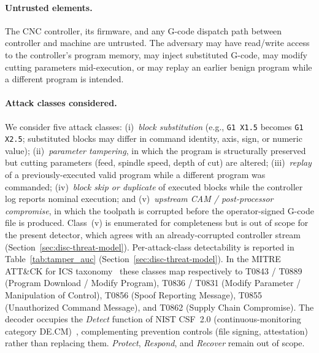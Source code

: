 \documentclass[sensors,article,submit,moreauthors,pdftex]{Definitions/mdpi}
\begin{document}
\paragraph{Untrusted elements.} The CNC controller, its firmware, and any G-code dispatch path between controller and machine are untrusted. The adversary may have read/write access to the controller's program memory, may inject substituted G-code, may modify cutting parameters mid-execution, or may replay an earlier benign program while a different program is intended.

\paragraph{Attack classes considered.} We consider five attack classes: (i)~\emph{block substitution} (e.g., \texttt{G1 X1.5} becomes \texttt{G1 X2.5}; substituted blocks may differ in command identity, axis, sign, or numeric value); (ii)~\emph{parameter tampering}, in which the program is structurally preserved but cutting parameters (feed, spindle speed, depth of cut) are altered; (iii)~\emph{replay} of a previously-executed valid program while a different program was commanded; (iv)~\emph{block skip or duplicate} of executed blocks while the controller log reports nominal execution; and (v)~\emph{upstream CAM / post-processor compromise}, in which the toolpath is corrupted before the operator-signed G-code file is produced. Class~(v) is enumerated for completeness but is out of scope for the present detector, which agrees with an already-corrupted controller stream (Section~\ref{sec:disc-threat-model}). Per-attack-class detectability is reported in Table~\ref{tab:tamper_auc} (Section~\ref{sec:disc-threat-model}). In the MITRE ATT\&CK for ICS taxonomy~\cite{mitre_attack_ics} these classes map respectively to T0843 / T0889 (Program Download / Modify Program), T0836 / T0831 (Modify Parameter / Manipulation of Control), T0856 (Spoof Reporting Message), T0855 (Unauthorized Command Message), and T0862 (Supply Chain Compromise). The decoder occupies the \emph{Detect} function of NIST CSF~2.0 (continuous-monitoring category DE.CM)~\cite{nistcsf2}, complementing prevention controls (file signing, attestation) rather than replacing them. \emph{Protect}, \emph{Respond}, and \emph{Recover} remain out of scope.
\end{document}
